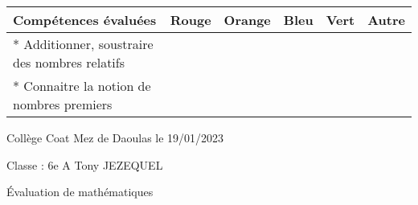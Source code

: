 \documentclass[a4paper,12pt,fleqn]{article}
\begin{document}
\begin{footnotesize}

\begin{center}

\begin{tabular}{|p{120mm}|p{8mm}|p{10mm}|p{8mm}|p{8mm}|p{8mm}|}

\hline
\textbf{Compétences évaluées} & \textbf{Rouge} & \textbf{Orange} & \textbf{Bleu} & \textbf{Vert} & \textbf{Autre} \\
\hline


*  Additionner, soustraire des nombres relatifs  & & & & & \\ 
\hline
*  Connaitre la notion de nombres premiers  & & & & & \\ 
\hline
\end{tabular}
\end{center}
\end{footnotesize}
 \par 
\medskip
 \par 
\medskip
\newpage
\setcounter{exo}{0}


Collège Coat Mez de Daoulas  \hfill  le 19/01/2023

Classe : 6e A \hfill Tony JEZEQUEL

\begin{center}
\begin{LARGE} Évaluation de mathématiques \end{LARGE}
\end{center}

\end{document}
